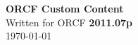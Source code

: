 \documentclass[a4paper]{article}
\begin{document}
\pagestyle{fancy}
\fancyhf{}
\fancyfoot[R]{\huge{\thepage}}

\vspace*{\fill}
\begin{center}
  \Huge{\textbf{ORCF Custom Content}} \\
  \vspace{2cm}
  \large{Written for ORCF \textbf{2011.07p}} \\
  \vspace{1cm}
  \large{\today}
  \vspace{3cm}
\end{center}
\vfill

\newpage

\tableofcontents

\newpage
\end{document}
